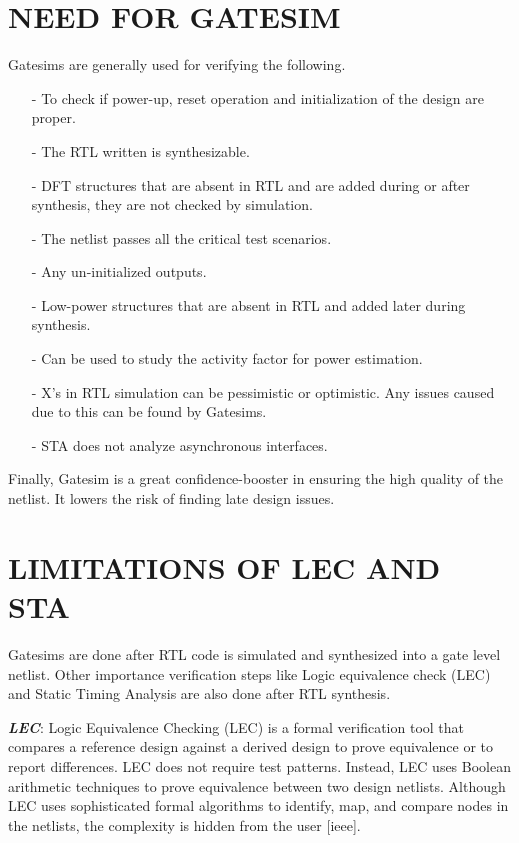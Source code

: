 \section {NEED FOR GATESIM}
Gatesims are generally used for verifying the following. 
\begin{itemize}
	\item[-]To check if power-up, reset operation and initialization of the design are proper.
	\item[-]The RTL written is synthesizable.
	\item[-]DFT structures that are absent in RTL and are added during or after synthesis, they are not checked by simulation.
	\item[-]The netlist passes all the critical test scenarios.
	\item[-]Any un-initialized outputs.
	\item[-]Low-power structures that are absent in RTL and added later during synthesis.
	\item[-]Can be used to study the activity factor for power estimation.
	\item[-]X's in RTL simulation can be pessimistic or optimistic. Any issues caused due to this can be found by Gatesims.
	\item[-]STA does not analyze asynchronous interfaces.
\end{itemize}

Finally, Gatesim is a great confidence-booster in ensuring the high quality of the netlist. It lowers the risk of finding late design issues.




\section{LIMITATIONS OF LEC AND STA}

Gatesims are done after RTL code is simulated and synthesized into a gate level netlist. Other importance verification steps like Logic equivalence check (LEC) and Static Timing Analysis are also done after RTL synthesis. 

\emph {\bf LEC}: Logic Equivalence Checking (LEC) is a formal verification tool that compares a reference design against a derived design to prove equivalence or to report differences.  LEC does not require test patterns. Instead, LEC uses Boolean arithmetic techniques to prove equivalence between two design netlists. Although LEC uses sophisticated formal algorithms to identify, map, and compare nodes in the netlists, the complexity is hidden from the user [ieee].

